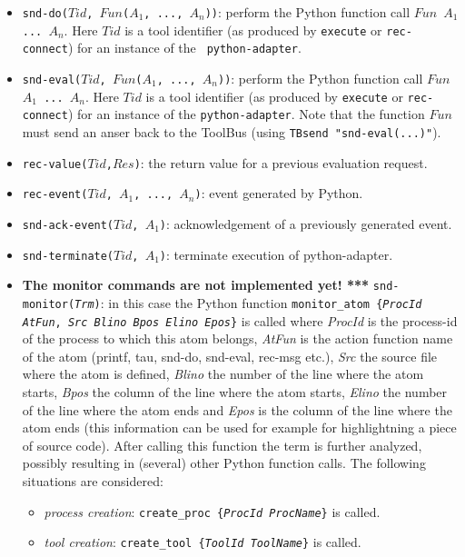 \begin{itemize}
\item {\tt snd-do($Tid$, $Fun$($A_1$, ..., $A_n$))}: perform the Python function call
{\tt $Fun$ $A_1$  ... $A_n$}. Here $Tid$ is a tool identifier
(as produced by {\tt execute} or {\tt rec-connect}) for an instance of the {\tt
python-adapter}.
\item {\tt snd-eval($Tid$, $Fun$($A_1$, ..., $A_n$))}: perform the Python function call
{\tt $Fun$ $A_1$  ... $A_n$}. Here $Tid$ is a tool identifier 
(as produced by {\tt execute} or {\tt rec-connect}) for an instance of the {\tt python-adapter}.
Note that the function {\tt $Fun$} must send an anser back to the
ToolBus (using {\tt TBsend "snd-eval(...)"}).
\item {\tt rec-value($Tid$,$Res$)}: the return value for a previous evaluation request.
\item {\tt rec-event($Tid$, $A_1$, ..., $A_n$)}: event generated by Python.
\item {\tt snd-ack-event($Tid$, $A_1$)}: acknowledgement of
a previously generated event.
\item {\tt snd-terminate($Tid$, $A_1$)}: terminate execution of python-adapter.
\item {\bf The monitor commands are not implemented yet! ***}
	\texttt{snd-monitor(\emph{Trm})}: in this case the Python
  function \texttt{monitor\_atom \{\emph{ProcId} \emph{AtFun},
    \emph{Src} \emph{Blino} \emph{Bpos} \emph{Elino} \emph{Epos}\}}
  is called where \emph{ProcId} is the process-id of the process to
  which this atom belongs, \emph{AtFun} is the action function name of
  the atom (printf, tau, snd-do, snd-eval, rec-msg etc.), \emph{Src} the
  source file where the atom is defined, \emph{Blino} the number of
  the line where the atom starts, \emph{Bpos} the column of the
  line where the atom starts, \emph{Elino} the number of the line
  where the atom ends and \emph{Epos} is the column of the line where
  the atom ends (this information can be used for example for
  highlightning a piece of source code). 
  After calling this function the term is further analyzed,
  possibly resulting in (several) other Python function
  calls. The following situations are considered:
  \begin{itemize}
  \item \emph{process creation}:
    \texttt{create\_proc \{\emph{ProcId} \emph{ProcName}\}} is
    called.
  \item \emph{tool creation}: \texttt{create\_tool \{\emph{ToolId}
      \emph{ToolName}\}} is called.

\end{itemize}
\end{itemize}
